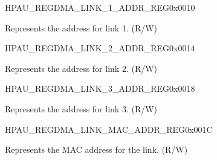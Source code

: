 \begin{register}{H}{PAU\_REGDMA\_LINK\_1\_ADDR\_REG}{0x0010}\label{regdesc:PAUREGDMALINK1ADDRREG}
%
\regnewline%
\begin{regdesc}\begin{reglist}
\label{fielddesc:PAULINKADDR1}\item [PAU\_LINK\_ADDR\_1] Represents the address for link 1. (R/W)
\end{reglist}\end{regdesc}
\end{register}


\begin{register}{H}{PAU\_REGDMA\_LINK\_2\_ADDR\_REG}{0x0014}\label{regdesc:PAUREGDMALINK2ADDRREG}
%
\regnewline%
\begin{regdesc}\begin{reglist}
\label{fielddesc:PAULINKADDR2}\item [PAU\_LINK\_ADDR\_2] Represents the address for link 2. (R/W)
\end{reglist}\end{regdesc}
\end{register}


\begin{register}{H}{PAU\_REGDMA\_LINK\_3\_ADDR\_REG}{0x0018}\label{regdesc:PAUREGDMALINK3ADDRREG}
%
\regnewline%
\begin{regdesc}\begin{reglist}
\label{fielddesc:PAULINKADDR3}\item [PAU\_LINK\_ADDR\_3] Represents the address for link 3. (R/W)
\end{reglist}\end{regdesc}
\end{register}


\begin{register}{H}{PAU\_REGDMA\_LINK\_MAC\_ADDR\_REG}{0x001C}\label{regdesc:PAUREGDMALINKMACADDRREG}
%
\regnewline%
\begin{regdesc}\begin{reglist}
\label{fielddesc:PAULINKADDRMAC}\item [PAU\_LINK\_ADDR\_MAC] Represents the MAC address for the link. (R/W)
\end{reglist}\end{regdesc}
\end{register}


